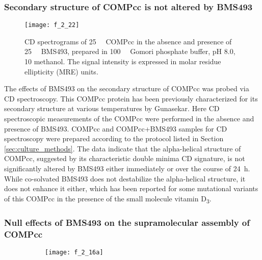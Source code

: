 \begin{refsection}
\subsubsection{Secondary structure of COMPcc is not altered by BMS493}
\label{sec:comp_cd}
\begin{figure}[h!] \centering \texttt{[image: f\_2\_22]}
    \caption{CD spectrograms of \SI{25}{\micro\moLar} COMPcc in the absence and
    presence of \SI{25}{\micro\moLar} BMS493, prepared in \SI{100}{\milli\moLar}
    Gomori phosphate buffer, pH 8.0, \SI{10}{\volper} methanol. The signal
    intensity is expressed in molar residue ellipticity (MRE)
units.}\label{fig:comp_cd} \end{figure}
The effects of BMS493 on the secondary structure of COMPcc was probed via CD
spectroscopy. This COMPcc protein has been previously characterized for its
secondary structure at various temperatures by Gunasekar.\cite{Gunasekar2009}
Here CD spectroscopic measurements of the COMPcc were performed in the absence and
presence of BMS493. COMPcc and COMPcc+BMS493 samples for CD spectroscopy were
prepared according to the protocol listed in Section \ref{sec:culture_methods}.
The data indicate that the alpha-helical structure of COMPcc, suggested by its
characteristic double minima CD signature, is not significantly altered by
BMS493 either immediately or over the course of \SI{24}{\hour}. While
co-solvated BMS493 does not destabilize the alpha-helical structure, it does not
enhance it either, which has been reported for some mutational variants of this
COMPcc in the presence of the small molecule vitamin
D\textsubscript{3}.\cite{Gunasekar2009}

\subsubsection{Null effects of BMS493 on the supramolecular assembly of COMPcc}
\begin{figure}[h!]
    \centering
    \begin{subfigure}[b]{0.5\textwidth}
        \texttt{[image: f\_2\_16a]}
        \caption{}
        \label{fig:zonal_elution_chrom}
    \end{subfigure}


\end{figure}
\end{refsection}
